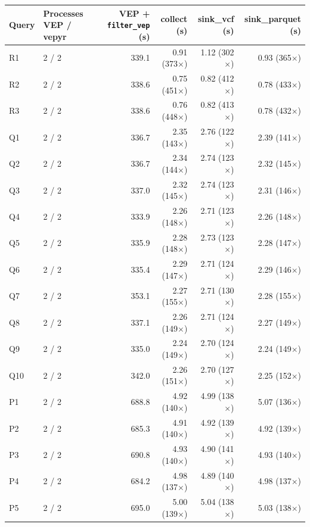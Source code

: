 \begin{tabular}{llrrrr}
\toprule
Query & Processes VEP / vepyr & VEP + \texttt{filter\_vep} (s) & collect (s) & sink\_vcf (s) & sink\_parquet (s) \\
\midrule
R1 & 2 / 2 & 339.1 & 0.91 (373$\times$) & 1.12 (302$\times$) & 0.93 (365$\times$) \\
R2 & 2 / 2 & 338.6 & 0.75 (451$\times$) & 0.82 (412$\times$) & 0.78 (433$\times$) \\
R3 & 2 / 2 & 338.6 & 0.76 (448$\times$) & 0.82 (413$\times$) & 0.78 (432$\times$) \\
Q1 & 2 / 2 & 336.7 & 2.35 (143$\times$) & 2.76 (122$\times$) & 2.39 (141$\times$) \\
Q2 & 2 / 2 & 336.7 & 2.34 (144$\times$) & 2.74 (123$\times$) & 2.32 (145$\times$) \\
Q3 & 2 / 2 & 337.0 & 2.32 (145$\times$) & 2.74 (123$\times$) & 2.31 (146$\times$) \\
Q4 & 2 / 2 & 333.9 & 2.26 (148$\times$) & 2.71 (123$\times$) & 2.26 (148$\times$) \\
Q5 & 2 / 2 & 335.9 & 2.28 (148$\times$) & 2.73 (123$\times$) & 2.28 (147$\times$) \\
Q6 & 2 / 2 & 335.4 & 2.29 (147$\times$) & 2.71 (124$\times$) & 2.29 (146$\times$) \\
Q7 & 2 / 2 & 353.1 & 2.27 (155$\times$) & 2.71 (130$\times$) & 2.28 (155$\times$) \\
Q8 & 2 / 2 & 337.1 & 2.26 (149$\times$) & 2.71 (124$\times$) & 2.27 (149$\times$) \\
Q9 & 2 / 2 & 335.0 & 2.24 (149$\times$) & 2.70 (124$\times$) & 2.24 (149$\times$) \\
Q10 & 2 / 2 & 342.0 & 2.26 (151$\times$) & 2.70 (127$\times$) & 2.25 (152$\times$) \\
P1 & 2 / 2 & 688.8 & 4.92 (140$\times$) & 4.99 (138$\times$) & 5.07 (136$\times$) \\
P2 & 2 / 2 & 685.3 & 4.91 (140$\times$) & 4.92 (139$\times$) & 4.92 (139$\times$) \\
P3 & 2 / 2 & 690.8 & 4.93 (140$\times$) & 4.90 (141$\times$) & 4.93 (140$\times$) \\
P4 & 2 / 2 & 684.2 & 4.98 (137$\times$) & 4.89 (140$\times$) & 4.98 (137$\times$) \\
P5 & 2 / 2 & 695.0 & 5.00 (139$\times$) & 5.04 (138$\times$) & 5.03 (138$\times$) \\
\bottomrule
\end{tabular}
